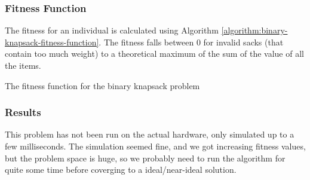 \subsubsection{Fitness Function}
The fitness for an individual is calculated using Algorithm \ref{algorithm:binary-knapsack-fitness-function}.
The fitness falls between 0 for invalid sacks (that contain too much weight) to a theoretical maximum of the sum of the value of all the items.

\begin{algorithm}[H]
\SetAlgoLined
\DontPrintSemicolon
{}
\caption{The fitness function for the binary knapsack problem}
\label{algorithm:binary-knapsack-fitness-function}
\end{algorithm}

\subsubsection{Results}

This problem has not been run on the actual hardware, only simulated up to a few milliseconds.
The simulation seemed fine, and we got increasing fitness values, but the problem space is huge, so we probably need to run the algorithm for quite some time before coverging to a ideal/near-ideal solution.

%
%
